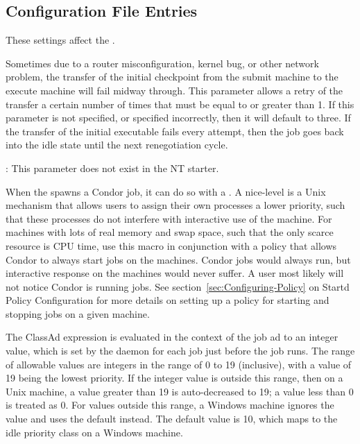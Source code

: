 \subsection{\label{sec:Starter-Config-File-Entries}
Configuration File Entries}

These settings affect the .
\begin{description}

\label{param:ExecTransferAttempts}
\item[\Macro{EXEC\_TRANSFER\_ATTEMPTS}]
  Sometimes due to a router misconfiguration, kernel bug, or other
  network problem, the transfer of the initial checkpoint from
  the submit machine to the execute machine will fail midway through.
  This parameter allows a retry of the transfer a certain number of times
  that must be equal to or greater than 1. If this parameter is not
  specified, or specified incorrectly, then it will default to three.
  If the transfer of the initial executable fails every attempt, then
  the job goes back into the idle state until the next renegotiation
  cycle.

  \Note: This parameter does not exist in the NT starter.

\label{param:JobReniceIncrement}
\item[\Macro{JOB\_RENICE\_INCREMENT}]
  When the  spawns a Condor job, it can do so with a
  .
  A nice-level is a
  Unix mechanism that allows users to assign their own processes a lower 
  priority, such that these processes do not interfere with interactive
  use of the machine.
  For machines with lots
  of real memory and swap space, such that the only scarce resource is CPU time,
  use this macro in conjunction with a policy that
  allows Condor to always start jobs on the machines. 
  Condor jobs would always run,
  but interactive response on the machines would never suffer.
  A user most likely will not notice Condor is
  running jobs.  See section~\ref{sec:Configuring-Policy} on
  Startd Policy Configuration for more details on setting up a
  policy for starting and stopping jobs on a given machine.

  The ClassAd expression is evaluated in the context of the job ad
  to an integer value, which is
  set by the  daemon for each job just before the
  job runs.
  The range of allowable values are integers in the range of 0 to 19
  (inclusive),
  with a value of 19 being the lowest priority.  
  If the integer value is outside this range,
  then on a Unix machine, a value greater than 19 is auto-decreased to 19;
  a value less than 0 is treated as 0.
  For values outside this range, a Windows machine ignores the value
  and uses the default instead.
  The default value is 10, which maps to the idle priority class on
  a Windows machine.


\end{description}
